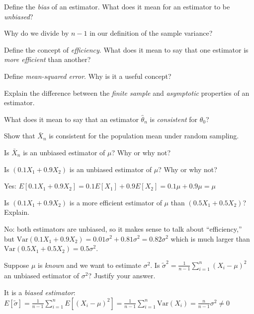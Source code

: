 \documentclass[addpoints,12pt]{exam}
\begin{document}
\begin{questions}

\question Define the \emph{bias} of an estimator. What does it mean for an estimator to be \emph{unbiased}?

\question Why do we divide by $n-1$ in our definition of the sample variance?

\question Define the concept of \emph{efficiency}. What does it mean to say that one estimator is \emph{more efficient} than another?

\question Define \emph{mean-squared error}. Why is it a useful concept?

\question Explain the difference between the \emph{finite sample} and \emph{asymptotic} properties of an estimator.

\question What does it mean to say that an estimator $\widehat{\theta}_n$ is \emph{consistent} for $\theta_0$?

\question Show that $\bar{X}_n$ is consistent for the population mean under random sampling.


  \question Is $\bar{X}_n$ is an unbiased estimator of $\mu$? Why or why not?

  \question Is $(0.1 X_1 + 0.9 X_2)$ is an unbiased estimator of $\mu$? Why or why not?
  \begin{solution}
    Yes: $E[0.1 X_1 + 0.9 X_2] = 0.1 E[X_1] + 0.9 E[X_2] = 0.1 \mu + 0.9\mu = \mu$
  \end{solution}

\question Is $(0.1X_1 + 0.9X_2)$ is a more efficient estimator of $\mu$ than $(0.5X_1 + 0.5X_2)$? Explain.
\begin{solution}
  No: both estimators are unbiased, so it makes sense to talk about ``efficiency,'' but $\mbox{Var}(0.1 X_1 + 0.9 X_2) = 0.01 \sigma^2 + 0.81 \sigma^2 = 0.82 \sigma^2$ which is much larger than $\mbox{Var}(0.5 X_1 + 0.5 X_2) = 0.5 \sigma^2$.
\end{solution}

\question Suppose $\mu$ is \emph{known} and we want to estimate $\sigma^2$. Is $\widetilde{\sigma}^2 = \frac{1}{n-1}\sum_{i=1}^n (X_i - \mu)^2$ an unbiased estimator of $\sigma^2$?
Justify your answer.
\begin{solution}
  It is a \emph{biased estimator}: $E[\widetilde{\sigma}] = \frac{1}{n-1} \sum_{i=1}^n E[(X_i - \mu)^2] = \frac{1}{n-1} \sum_{i=1}^n \mbox{Var}(X_i) = \frac{n}{n-1} \sigma^2 \neq 0$
\end{solution}


\end{questions}
\end{document}
